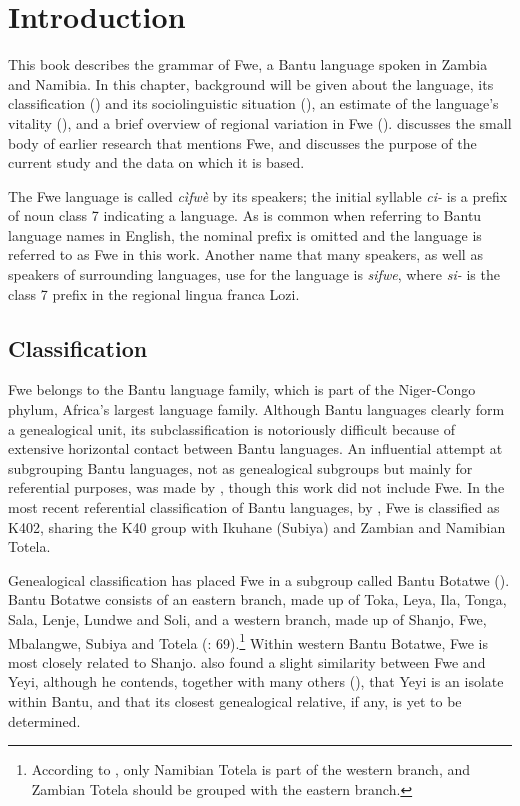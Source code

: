 

\chapter{Introduction}
\hypertarget{Toc75352593}{}
This book describes the grammar of Fwe, a Bantu language spoken in Zambia and Namibia. In this chapter, background will be given about the language, its classification () and its sociolinguistic situation (), an estimate of the language’s vitality (), and a brief overview of regional variation in Fwe ().  discusses the small body of earlier research that mentions Fwe, and  discusses the purpose of the current study and the data on which it is based.

The Fwe language is called \textit{cìfwè} by its speakers; the initial syllable \textit{ci-} is a prefix of noun class 7 indicating a language. As is common when referring to Bantu language names in English, the nominal prefix is omitted and the language is referred to as Fwe in this work. Another name that many speakers, as well as speakers of surrounding languages, use for the language is \textit{sifwe}, where \textit{si-} is the class 7 prefix in the regional lingua franca Lozi.

\section{Classification}
\label{bkm:Ref450562312}\hypertarget{Toc75352594}{}
Fwe belongs to the Bantu language family, which is part of the Niger-Congo phylum, Africa’s largest language family. Although Bantu languages clearly form a genealogical unit, its subclassification is notoriously difficult because of extensive horizontal contact between Bantu languages. An influential attempt at subgrouping Bantu languages, not as genealogical subgroups but mainly for referential purposes, was made by {\citet{Guthrie1948}}, though this work did not include Fwe. In the most recent referential classification of Bantu languages, by {\citet{Hammarström2019}}, Fwe is classified as K402, sharing the K40 group with Ikuhane (Subiya) and Zambian and Namibian Totela.

Genealogical classification has placed Fwe in a subgroup called Bantu Botatwe (\citealt{Bostoen2009,Luna2010}). Bantu Botatwe consists of an eastern branch, made up of Toka, Leya, Ila, Tonga, Sala, Lenje, Lundwe and Soli, and a western branch, made up of Shanjo, Fwe, Mbalangwe, Subiya and Totela (\citealt{Luna2010}: 69).\footnote{According to \citet[54-55]{Crane2011}, only Namibian Totela is part of the western branch, and Zambian Totela should be grouped with the eastern branch.} Within western Bantu Botatwe, Fwe is most closely related to Shanjo. {\citet{Seidel2005}} also found a slight similarity between Fwe and Yeyi, al\-though he contends, together with many others (\citealt{Andersson1997,Elderkin1998,Sommer1995}), that Yeyi is an isolate within Bantu, and that its closest genealogical relative, if any, is yet to be determined.

